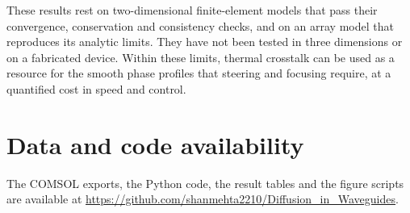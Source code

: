 These results rest on two-dimensional finite-element models that pass their convergence, conservation and consistency
checks, and on an array model that reproduces its analytic limits. They have not been tested in three dimensions or on
a fabricated device. Within these limits, thermal crosstalk can be used as a resource for the smooth phase profiles
that steering and focusing require, at a quantified cost in speed and control.

\section*{Data and code availability}
The COMSOL exports, the Python code, the result tables and the figure scripts are available at
\url{https://github.com/shanmehta2210/Diffusion_in_Waveguides}.
